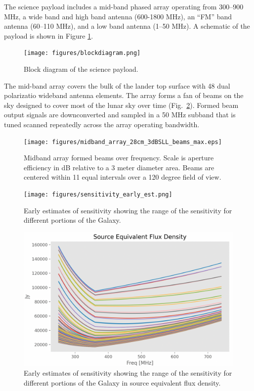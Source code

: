 The science payload includes a mid-band phased array operating from 300--900 MHz, a wide band and high band antenna (600-1800 MHz), an ``FM'' band antenna (60--110 MHz), and a low band antenna (1--50 MHz). A schematic of the payload is shown in Figure \ref{fig:block}.

\begin{figure}
	\centering
	\texttt{[image: figures/blockdiagram.png]}
	\caption{Block diagram of the science payload.\label{fig:block}}
\end{figure}

The mid-band array covers the bulk of the lander top surface with 48 dual polarizatio wideband antenna elements. The array forms a fan of beams on the sky designed to cover most of the lunar sky over time (Fig.\ \ref{fig:midband_beam_maps}). Formed beam output signals are downconverted and sampled in a 50 MHz subband that is tuned scanned repeatedly across the array operating bandwidth. 

\begin{figure}
	\centering
	\texttt{[image: figures/midband\_array\_28cm\_3dBSLL\_beams\_max.eps]}
	\caption{Midband array formed beams over frequency. Scale is aperture efficiency in dB relative to a 3 meter diameter area. Beams are centered within 11 equal intervals over a 120 degree field of view.}
	\label{fig:midband_beam_maps}
\end{figure}

\begin{figure}
	\centering
	\texttt{[image: figures/sensitivity\_early\_est.png]}
	\caption{Early estimates of sensitivity showing the range of the sensitivity for different portions of the Galaxy.\label{sensitivity}}
\end{figure}

\begin{figure}
	\centering
	\includegraphics[width=0.75\linewidth]{figures/sefd.png}
	\caption{Early estimates of sensitivity showing the range of the sensitivity for different portions of the Galaxy in source equivalent flux density.\label{sefd}}
\end{figure}